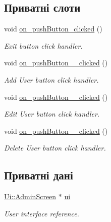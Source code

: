 \subsection*{Приватні слоти}
\begin{DoxyCompactItemize}
\item 
\hypertarget{classAdminScreen_a7703410aa4d2734d31709f9655f287c0}{void \hyperlink{classAdminScreen_a7703410aa4d2734d31709f9655f287c0}{on\-\_\-push\-Button\-\_\-clicked} ()}\label{classAdminScreen_a7703410aa4d2734d31709f9655f287c0}

\begin{DoxyCompactList}\small\item\em Exit button click handler. \end{DoxyCompactList}\item 
\hypertarget{classAdminScreen_ad02b4a1ec883694d28847019d8e650c1}{void \hyperlink{classAdminScreen_ad02b4a1ec883694d28847019d8e650c1}{on\-\_\-push\-Button\-\_\-\_\-clicked} ()}\label{classAdminScreen_ad02b4a1ec883694d28847019d8e650c1}

\begin{DoxyCompactList}\small\item\em Add User button click handler. \end{DoxyCompactList}\item 
\hypertarget{classAdminScreen_a90d4be9d4a2273ec26b0059cc6da9138}{void \hyperlink{classAdminScreen_a90d4be9d4a2273ec26b0059cc6da9138}{on\-\_\-push\-Button\-\_\-\_\-clicked} ()}\label{classAdminScreen_a90d4be9d4a2273ec26b0059cc6da9138}

\begin{DoxyCompactList}\small\item\em Edit User button click handler. \end{DoxyCompactList}\item 
\hypertarget{classAdminScreen_a296a55f8e538172ff854aa727a6d054e}{void \hyperlink{classAdminScreen_a296a55f8e538172ff854aa727a6d054e}{on\-\_\-push\-Button\-\_\-\_\-clicked} ()}\label{classAdminScreen_a296a55f8e538172ff854aa727a6d054e}

\begin{DoxyCompactList}\small\item\em Delete User button click handler. \end{DoxyCompactList}\end{DoxyCompactItemize}
\subsection*{Приватні дані}
\begin{DoxyCompactItemize}
\item 
\hypertarget{classAdminScreen_af391e83bd7c335fc7bfa49333421a263}{\hyperlink{classUi_1_1AdminScreen}{Ui\-::\-Admin\-Screen} $\ast$ \hyperlink{classAdminScreen_af391e83bd7c335fc7bfa49333421a263}{ui}}\label{classAdminScreen_af391e83bd7c335fc7bfa49333421a263}

\begin{DoxyCompactList}\small\item\em User interface reference. \end{DoxyCompactList}\end{DoxyCompactItemize}


